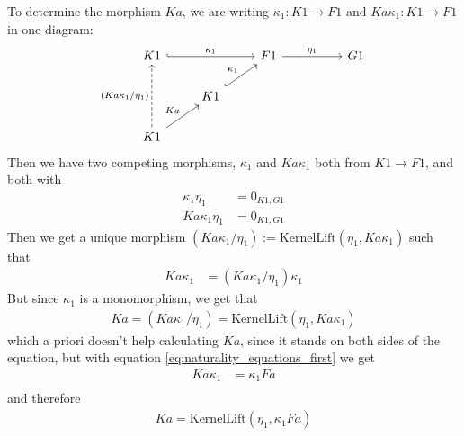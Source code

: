 \begin{example}
To determine the morphism $Ka$, we are writing $\kappa_{1} : K1 \rightarrow F1$ and $Ka \kappa_{1} : K1 \rightarrow F1$ in one diagram:
\[
\begin{tikzcd}
K1 \arrow[rr, "\kappa_{1}", hook]                                 &                                   & F1 \arrow[rr, "\eta_{1}"] &  & G1 \\
                                                                  & K1 \arrow[ru, "\kappa_{1}", hook] &                           &  &    \\
K1 \arrow[ru, "Ka"] \arrow[uu, "(Ka\kappa_{1}/\eta_{1})", dashed] &                                   &                           &  &   
\end{tikzcd}
\]
Then we have two competing morphisms, $\kappa_{1}$ and $Ka \kappa_{1}$ both from $K1 \rightarrow F1$, and both with
\begin{align*}
\kappa_{1}\eta_{1} &= 0_{K1,G1} \\
Ka \kappa_{1}\eta_{1} &= 0_{K1,G1}
\end{align*}
Then we get a unique morphism $(Ka\kappa_{1}/\eta_{1}) := \mathrm{KernelLift}(\eta_{1},Ka\kappa_{1})$ such that
\begin{align*}
Ka\kappa_{1} &= (Ka\kappa_{1}/\eta_{1})\kappa_{1}
\end{align*}
But since $\kappa_{1}$ is a monomorphism, we get that
\begin{align*}
Ka = (Ka\kappa_{1}/\eta_{1}) = \mathrm{KernelLift}(\eta_{1},Ka\kappa_{1})
\end{align*}
which a priori doesn't help calculating $Ka$, since it stands on both sides of the equation, but with equation
\eqref{eq:naturality_equations_first} we get
\begin{align*}
Ka\kappa_{1} &= \kappa_{1} Fa \\
\end{align*}
and therefore
\begin{align*}
Ka = \mathrm{KernelLift}(\eta_{1},\kappa_{1} Fa)
\end{align*}
\end{example}